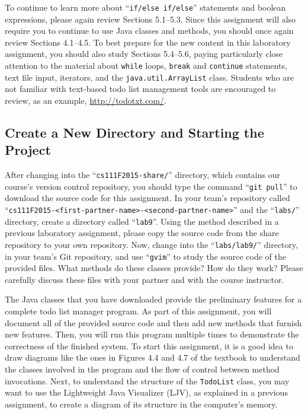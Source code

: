 To continue to learn more about ``{\tt if/else if/else}'' statements and boolean expressions, please again review
Sections 5.1--5.3. Since this assignment will also require you to continue to use Java classes and methods, you should
once again review Sections 4.1--4.5.  To best prepare for the new content in this laboratory assignment, you should also
study Sections 5.4--5.6, paying particularly close attention to the material about {\tt while} loops, {\tt break} and
{\tt continue} statements, text file input, iterators, and the {\tt java.util.ArrayList} class. Students who are not
familiar with text-based todo list management tools are encouraged to review, as an example, \url{http://todotxt.com/}.

\vspace{-0.1in}
\subsection*{Create a New Directory and Starting the Project}
\vspace{-0.05in}

After changing into the ``{\tt cs111F2015-share/}'' directory, which contains our course's version control repository,
you should type the command ``{\tt git pull}'' to download the source code for this assignment.  In your team's
repository called ``{\tt cs111F2015-<first-partner-name>-<second-partner-name>}'' and the ``{\tt labs/}'' directory, create
a directory called ``{\tt lab9}''. Using the method described in a previous laboratory assignment, please copy the
source code from the share repository to your own repository. Now, change into the ``{\tt labs/lab9/}'' directory, in
your team's Git repository, and use ``{\tt gvim}'' to study the source code of the provided files. What methods do these
classes provide? How do they work? Please carefully discuss these files with your partner and with the course
instructor.

The Java classes that you have downloaded provide the preliminary features for a complete todo list manager program. As
part of this assignment, you will document all of the provided source code and then add new methods that furnish new
features.  Then, you will run this program multiple times to demonstrate the correctness of the finished system. To
start this assignment, it is a good idea to draw diagrams like the ones in Figures 4.4 and 4.7 of the textbook to
understand the classes involved in the program and the flow of control between method invocations. Next, to understand
the structure of the {\tt TodoList} class, you may want to use the Lightweight Java Visualizer (LJV), as explained in a
previous assignment, to create a diagram of its structure in the computer's memory.

